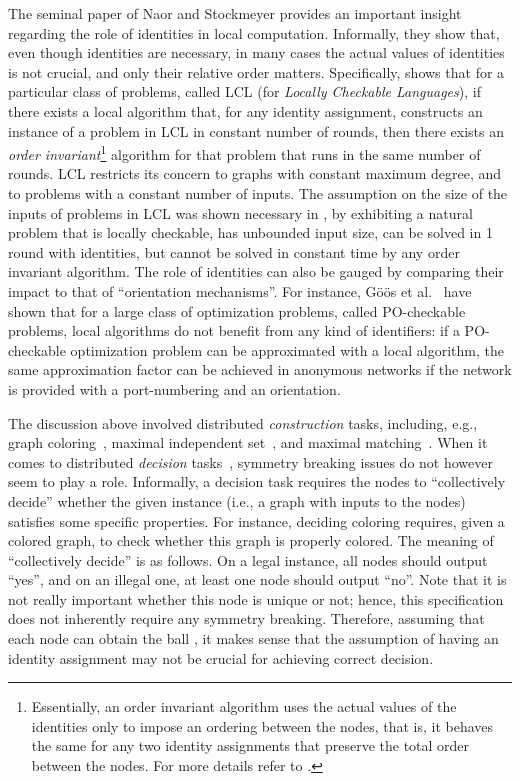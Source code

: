 \documentclass{llncs}
\begin{document}
The seminal paper of Naor and Stockmeyer \cite{NS93} provides an important insight regarding the role of identities in local computation. Informally, they show that, even though identities are necessary,  in many cases the actual values of identities is not crucial, and only their relative order matters. Specifically,  \cite{NS93} shows that for a particular class of problems, called LCL (for \emph{Locally Checkable Languages}), if there exists a local algorithm that, for any identity assignment, constructs an instance of a problem in LCL in constant number of rounds,  then there exists an \emph{order invariant}\footnote{Essentially, an order invariant algorithm uses the actual values of the identities only to impose an ordering between the nodes, that is, it behaves the same for any two identity assignments that preserve the total order between the nodes. For more details refer to \cite{NS93}.} algorithm  for that problem that  runs in the same number of rounds. LCL restricts its concern to graphs with constant maximum degree, and to problems with a constant number of inputs. The assumption on the size of the inputs of problems in LCL was shown necessary in \cite{HHRS12}, by exhibiting a natural problem that is locally checkable, has unbounded input size,  can be solved in 1 round with identities, but cannot be solved in constant time by any order invariant algorithm. The role of identities can also be gauged by comparing their impact to that of ``orientation mechanisms''.  For instance, G\"o\"os et al.~\cite{GHS12} have shown that for a large class of optimization problems, called PO-checkable problems, local algorithms do not benefit from any kind of identifiers: if a PO-checkable optimization problem can be approximated with a local algorithm, the same approximation factor can be achieved in anonymous networks if the network is provided with a port-numbering and an orientation.  

The discussion above involved distributed
\emph{construction} tasks, including, e.g., graph
coloring~\cite{BM09,K09,L92,NS93,PS96}, maximal independent
set~\cite{L92,PS96}, and maximal matching~\cite{HKP01,LPR09}. 
When it
comes to distributed \emph{decision} tasks~\cite{FKP11,FKPP12},
symmetry breaking issues do not however seem to play a
role. Informally, a decision task requires the nodes to ``collectively
decide'' whether the given instance (i.e., a graph with inputs to the
nodes) satisfies some specific properties. For instance, deciding
coloring requires, given a colored graph, to check whether this graph
is properly colored. The meaning of ``collectively decide'' is as
follows. On a legal instance, all nodes should output ``yes'', and on
an illegal one, at least one node should output ``no''. Note that it
is not really important whether this node is unique or not; hence, this
specification does not inherently require any symmetry
breaking. Therefore, assuming that each node  can obtain the ball
, it makes sense that the assumption of having an identity
assignment may not be crucial for achieving correct decision.
\end{document}
